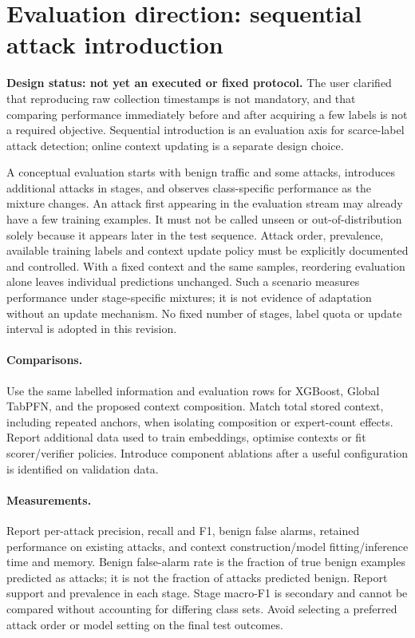\section{Evaluation direction: sequential attack introduction}
\textbf{Design status: not yet an executed or fixed protocol.} The user clarified that reproducing raw collection timestamps is not mandatory, and that comparing performance immediately before and after acquiring a few labels is not a required objective. Sequential introduction is an evaluation axis for scarce-label attack detection; online context updating is a separate design choice.

A conceptual evaluation starts with benign traffic and some attacks, introduces additional attacks in stages, and observes class-specific performance as the mixture changes. An attack first appearing in the evaluation stream may already have a few training examples. It must not be called unseen or out-of-distribution solely because it appears later in the test sequence. Attack order, prevalence, available training labels and context update policy must be explicitly documented and controlled. With a fixed context and the same samples, reordering evaluation alone leaves individual predictions unchanged. Such a scenario measures performance under stage-specific mixtures; it is not evidence of adaptation without an update mechanism. No fixed number of stages, label quota or update interval is adopted in this revision.

\paragraph{Comparisons.} Use the same labelled information and evaluation rows for XGBoost, Global TabPFN, and the proposed context composition. Match total stored context, including repeated anchors, when isolating composition or expert-count effects. Report additional data used to train embeddings, optimise contexts or fit scorer/verifier policies. Introduce component ablations after a useful configuration is identified on validation data.

\paragraph{Measurements.} Report per-attack precision, recall and F1, benign false alarms, retained performance on existing attacks, and context construction/model fitting/inference time and memory. Benign false-alarm rate is the fraction of true benign examples predicted as attacks; it is not the fraction of attacks predicted benign. Report support and prevalence in each stage. Stage macro-F1 is secondary and cannot be compared without accounting for differing class sets. Avoid selecting a preferred attack order or model setting on the final test outcomes.

